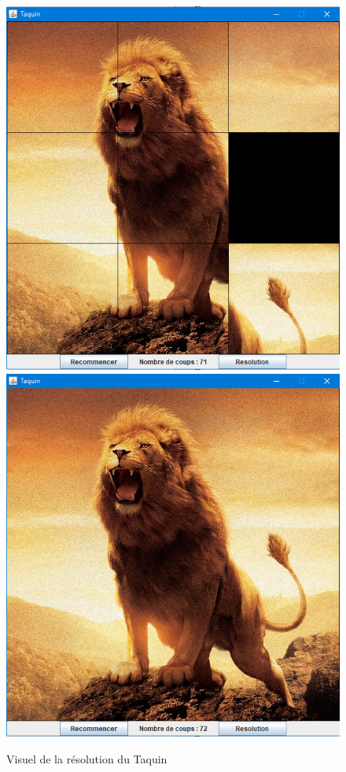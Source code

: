 \documentclass[a4paper,12pt]{article} %
\begin{document}
\begin{figure}[!h]
\centering
\includegraphics[scale=0.4]{images/Capture3.PNG}
\hspace{0.2cm}
\includegraphics[scale=0.4]{images/Capture4.PNG}
\caption{Visuel de la résolution du Taquin}
\end{figure}
\end{document}
